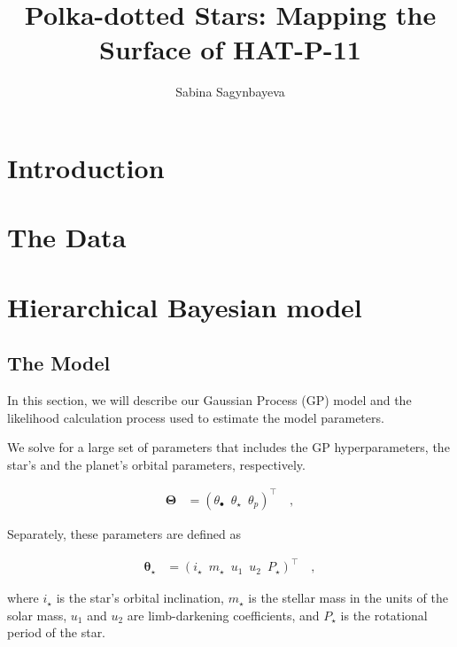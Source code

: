 \documentclass[twocolumn]{aastex631}
\begin{document}
\title{Polka-dotted Stars: Mapping the Surface of HAT-P-11}

\author{Sabina Sagynbayeva}

\begin{abstract}
   
\end{abstract}

\section{Introduction}
\label{sec:intro}

\section{The Data}
\section{Hierarchical Bayesian model}
\subsection{The Model}
In this section, we will describe our Gaussian Process (GP) model and the likelihood calculation process used to estimate the model parameters. 

We solve for a large set of parameters that includes the GP hyperparameters, the star's and the planet's orbital parameters, respectively. 
\begin{linenomath}\begin{align}
    \label{eq:largetheta}
    \pmb{\Theta}
     & =
    \left(
    \theta_\bullet
    \,\,\,
    \theta_\star
    \,\,\,
    \theta_p
    \right)^\top
    \quad,
\end{align}\end{linenomath}

Separately, these parameters are defined as 
\begin{linenomath}\begin{align}
    \label{eq:thetastar}
    \pmb{\theta_\star}
     & =
    \left(
    i_\star
    \,\,\,
    m_\star
    \,\,\,
    u_1
    \,\,\,
    u_2
    \,\,\,
    P_\star
    \right)^\top
    \quad,
\end{align}\end{linenomath}
where $i_\star$ is the star's orbital inclination, $m_\star$ is the stellar mass in the units of the solar mass, $u_1$ and $u_2$ are limb-darkening coefficients,
and $P_\star$ is the rotational period of the star.
\end{document}
